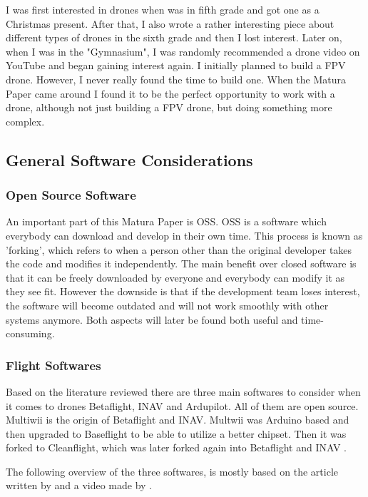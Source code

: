 \documentclass[svgnames]{article}
\begin{document}
	I was first interested in drones when was in fifth grade and got one as a Christmas present. After that, I also wrote a rather interesting piece about different types of drones in the sixth grade and then I lost interest. Later on, when I was in the "Gymnasium", I was randomly recommended a drone video on YouTube and began gaining interest again. I initially planned to build a \gls{FPV} drone. However, I never really found the time to build one. When the Matura Paper came around I found it to be the perfect opportunity to work with a drone, although not just building a \gls{FPV} drone, but doing something more complex.


	
	\subsection{General Software Considerations}
	\subsubsection{Open Source Software}
	An important part of this Matura Paper is \gls{OSS}. \gls{OSS} is a software which everybody can download and develop in their own time. This process is known as 'forking', which refers to when a person other than the original developer takes the code and modifies it independently. The main benefit over closed software is that it can be freely downloaded by everyone and everybody can modify it as they see fit. However the downside is that if the development team loses interest, the software will become outdated and will not work smoothly with other systems anymore. Both aspects will later be found both useful and time-consuming. 
	
	
	\subsubsection{Flight Softwares}
	Based on the literature reviewed there are three main softwares to consider when it comes to drones Betaflight, INAV and Ardupilot. All of them are open source. Multiwii is the origin of Betaflight and INAV. Multwii was Arduino based and then upgraded to Baseflight to be able to utilize a better chipset. Then it was forked to Cleanflight, which was later forked again into Betaflight and INAV \cite{history}. 
	
	The following overview of the three softwares, is mostly based on the article written by \textcite{firmwarearticle} and a video made by \textcite{firmwarevideo}.
	
\end{document}
